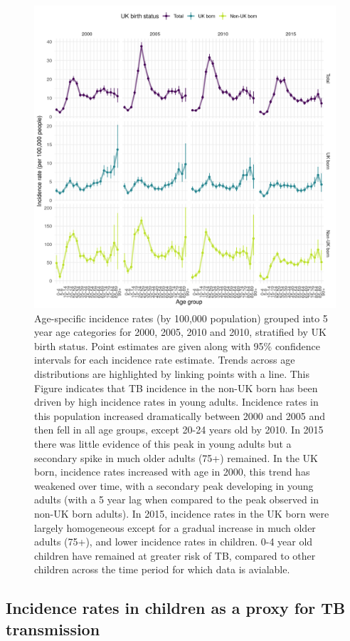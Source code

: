 \documentclass[11pt,twoside]{bristolthesis}
\begin{document}
  \begin{figure}
  
  {\centering \includegraphics[width=0.8\linewidth,]{chapters/tb-epi-england/figures/plot-age-dist-inc-rates} 
  
  }
  
  \caption[Age-specific incidence rates (by 100,000 population) grouped into 5 year age categories for 2000, 2005, 2010 and 2010, stratified by UK birth status.]{Age-specific incidence rates (by 100,000 population) grouped into 5 year age categories for 2000, 2005, 2010 and 2010, stratified by UK birth status. Point estimates are given along with 95\% confidence intervals for each incidence rate estimate. Trends across age distributions are highlighted by linking points with a line. This Figure indicates that TB incidence in the non-UK born has been driven by high incidence rates in young adults. Incidence rates in this population increased dramatically between 2000 and 2005 and then fell in all age groups, except 20-24 years old by 2010. In 2015 there was little evidence of this peak in young adults but a secondary spike in much older adults (75+) remained. In the UK born, incidence rates increased with age in 2000, this trend has weakened over time, with a secondary peak developing in young adults (with a 5 year lag when compared to the peak observed in non-UK born adults). In 2015, incidence rates in the UK born were largely homogeneous except for a gradual increase in much older adults (75+), and lower incidence rates in children. 0-4 year old children have remained at greater risk of TB, compared to other children across the time period for which data is avialable.}\label{fig:plot-age-dist-inc-rates}
  \end{figure}
  \hypertarget{incidence-rates-in-children-as-a-proxy-for-tb-transmission}{%
  \subsection{Incidence rates in children as a proxy for TB transmission}\label{incidence-rates-in-children-as-a-proxy-for-tb-transmission}}
  
\end{document}
